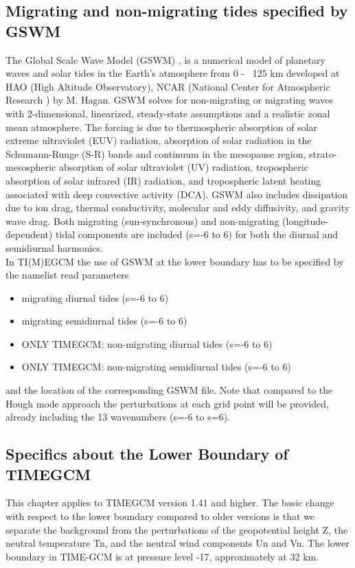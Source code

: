 \subsection{Migrating and non-migrating tides specified by GSWM}
%
The Global Scale Wave Model (GSWM) \cite{Hagan2002},\cite{Hagan2003} is a numerical model 
of planetary waves and 
solar tides in the Earth's atmosphere from 0 - ~125 km developed at 
HAO (High Altitude Observatory), NCAR (National Center for Atmospheric Research ) 
by M. Hagan. GSWM solves for non-migrating or migrating waves with 2-dimensional, 
linearized, steady-state assumptions and a realistic zonal mean atmosphere. 
The forcing is due to thermospheric absorption of solar extreme ultraviolet (EUV) radiation,
absorption of solar radiation in the Schumann-Runge (S-R) bands and continuum in the 
mesopause region, strato-mesospheric absorption of solar ultraviolet (UV) radiation,
tropospheric absorption of solar infrared (IR) radiation, and
tropospheric latent heating associated with deep convective activity (DCA).  
GSWM also includes dissipation due to ion drag, thermal conductivity, molecular and eddy
diffusivity, and gravity wave drag.
Both migrating (sun-synchronous) and non-migrating 
(longitude-dependent) tidal components are included (s=-6 to 6) for both the diurnal and semidiurnal
harmonics.  \\
%
In TI(M)EGCM the use of GSWM at the lower boundary has to be specified by the namelist read
parameters
%
\begin{itemize}
  \item migrating diurnal tides (s=-6 to 6) 
  \item migrating semidiurnal tides (s=-6 to 6) 
  \item ONLY TIMEGCM: non-migrating diurnal tides (s=-6 to 6) 
  \item ONLY TIMEGCM: non-migrating semidiurnal tides (s=-6 to 6) 
\end{itemize} 
%
and the location of the corresponding GSWM file. Note that compared to the Hough mode approach the
perturbations at each grid point will be provided, already including the 13 wavenumbers (s=-6 to
s=6).
\subsection{Specifics about the Lower Boundary of TIMEGCM}
%
This chapter applies to TIMEGCM version 1.41 and higher. The basic change with
respect to the lower boundary compared to older versions is that we separate the
background from the perturbations of the geopotential height Z, the neutral
temperature Tn, and the neutral wind components Un and Vn. The lower boundary in
TIME-GCM is at pressure level -17, approximately at 32 km.
%
